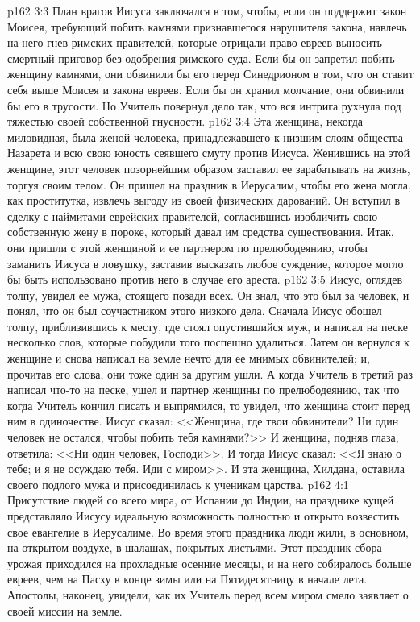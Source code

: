 \vs p162 3:3 План врагов Иисуса заключался в том, чтобы, если он поддержит закон Моисея, требующий побить камнями признавшегося нарушителя закона, навлечь на него гнев римских правителей, которые отрицали право евреев выносить смертный приговор без одобрения римского суда. Если бы он запретил побить женщину камнями, они обвинили бы его перед Синедрионом в том, что он ставит себя выше Моисея и закона евреев. Если бы он хранил молчание, они обвинили бы его в трусости. Но Учитель повернул дело так, что вся интрига рухнула под тяжестью своей собственной гнусности.
\vs p162 3:4 Эта женщина, некогда миловидная, была женой человека, принадлежавшего к низшим слоям общества Назарета и всю свою юность сеявшего смуту против Иисуса. Женившись на этой женщине, этот человек позорнейшим образом заставил ее зарабатывать на жизнь, торгуя своим телом. Он пришел на праздник в Иерусалим, чтобы его жена могла, как проститутка, извлечь выгоду из своей физических дарований. Он вступил в сделку с наймитами еврейских правителей, согласившись изобличить свою собственную жену в пороке, который давал им средства существования. Итак, они пришли с этой женщиной и ее партнером по прелюбодеянию, чтобы заманить Иисуса в ловушку, заставив высказать любое суждение, которое могло бы быть использовано против него в случае его ареста.
\vs p162 3:5 Иисус, оглядев толпу, увидел ее мужа, стоящего позади всех. Он знал, что это был за человек, и понял, что он был соучастником этого низкого дела. Сначала Иисус обошел толпу, приблизившись к месту, где стоял опустившийся муж, и написал на песке несколько слов, которые побудили того поспешно удалиться. Затем он вернулся к женщине и снова написал на земле нечто для ее мнимых обвинителей; и, прочитав его слова, они тоже один за другим ушли. А когда Учитель в третий раз написал что\hyp{}то на песке, ушел и партнер женщины по прелюбодеянию, так что когда Учитель кончил писать и выпрямился, то увидел, что женщина стоит перед ним в одиночестве. Иисус сказал: <<Женщина, где твои обвинители? Ни один человек не остался, чтобы побить тебя камнями?>> И женщина, подняв глаза, ответила: <<Ни один человек, Господи>>. И тогда Иисус сказал: <<Я знаю о тебе; и я не осуждаю тебя. Иди с миром>>. И эта женщина, Хилдана, оставила своего подлого мужа и присоединилась к ученикам царства.
\vs p162 4:1 Присутствие людей со всего мира, от Испании до Индии, на празднике кущей представляло Иисусу идеальную возможность полностью и открыто возвестить свое евангелие в Иерусалиме. Во время этого праздника люди жили, в основном, на открытом воздухе, в шалашах, покрытых листьями. Этот праздник сбора урожая приходился на прохладные осенние месяцы, и на него собиралось больше евреев, чем на Пасху в конце зимы или на Пятидесятницу в начале лета. Апостолы, наконец, увидели, как их Учитель перед всем миром смело заявляет о своей миссии на земле.
